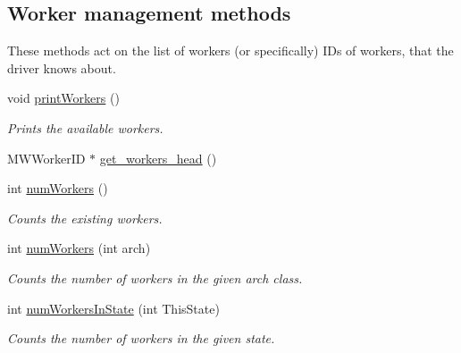 \subsection*{Worker management methods}
\label{_amgrp80808ba8658e68b726aab8345b141562}%
These methods act on the list of workers (or specifically) ID\textquotesingle{}s of workers, that the driver knows about. \begin{DoxyCompactItemize}
\item 
\mbox{\label{classMWDriver_a7cd3d2d9ba6a9e0e89511b6114a18632}} 
void \hyperlink{classMWDriver_a7cd3d2d9ba6a9e0e89511b6114a18632}{print\+Workers} ()
\begin{DoxyCompactList}\small\item\em Prints the available workers. \end{DoxyCompactList}\item 
M\+W\+Worker\+ID $\ast$ \hyperlink{classMWDriver_a08d81fbcaa68a8fb4ec11afcd81abc1b}{get\+\_\+workers\+\_\+head} ()
\item 
\mbox{\label{classMWDriver_ada183d37afd5f06bf96c3f716ca90075}} 
int \hyperlink{classMWDriver_ada183d37afd5f06bf96c3f716ca90075}{num\+Workers} ()
\begin{DoxyCompactList}\small\item\em Counts the existing workers. \end{DoxyCompactList}\item 
\mbox{\label{classMWDriver_a4930b0cd40ef0940732ba0b5057c7f15}} 
int \hyperlink{classMWDriver_a4930b0cd40ef0940732ba0b5057c7f15}{num\+Workers} (int arch)
\begin{DoxyCompactList}\small\item\em Counts the number of workers in the given arch class. \end{DoxyCompactList}\item 
\mbox{\label{classMWDriver_a1b0cd5e8c9a5e7561886fb1b7a48a7d1}} 
int \hyperlink{classMWDriver_a1b0cd5e8c9a5e7561886fb1b7a48a7d1}{num\+Workers\+In\+State} (int This\+State)
\begin{DoxyCompactList}\small\item\em Counts the number of workers in the given state. \end{DoxyCompactList}\item 
\mbox{\label{classMWDriver_add3bc92ab03d051502e69ca03de4928f}} 

\end{DoxyCompactItemize}
